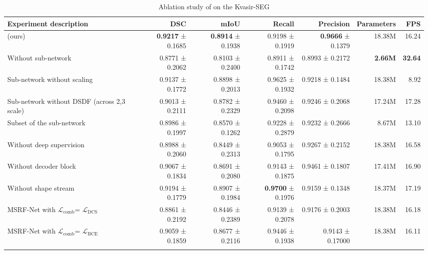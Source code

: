 \documentclass[journal,twoside,web]{IEEEtran}
\newcommand{\loss}{\ensuremath{\mathcal{L}}}
\newcommand{\lbce}{\ensuremath{\loss_\text{BCE}}\xspace}
\newcommand{\ldcs}{\ensuremath{\loss_\text{DCS}}\xspace}
\newcommand{\lcomb}{\ensuremath{\loss_\text{comb}}\xspace}
\newcommand{\sysname}{\text{MSRF-Net}\xspace}
\begin{document}
\begin{table*}
\centering
\caption{Ablation study of \sysname on the Kvasir-SEG}
\label{table:ablationstudy}
\scriptsize
\begin{center}
{
	\begin{tabular}{@{}l|r|r|r|r|r|r@{}} 
		\toprule
		 \textbf{Experiment description} & \textbf{DSC} & \textbf{mIoU} & \textbf{Recall} & \textbf{Precision} & \textbf{Parameters} & \textbf{FPS} \\ \hline
		 \hline
		 \sysname(ours) & \textbf{0.9217} ±  0.1685 & \textbf{0.8914} ± 0.1938 & 0.9198 ± 0.1919 & \textbf{0.9666} ± 0.1379 & 18.38M & 16.24\\ \hline
		 Without sub-network &0.8771 ± 0.2062 &0.8103 ± 0.2400 & 0.8911 ±  0.1742 & 0.8993 ± 0.2172 &  \textbf{2.66M} &  \textbf{32.64} \\ \hline
		 Sub-network without scaling &0.9137 ± 0.1772 &0.8898 ± 0.2013 &0.9625 ± 0.1932 &0.9218 ± 0.1484 & 18.38M & 8.92 \\ \hline
		 Sub-network without DSDF (across 2,3 scale) & 0.9013 ± 0.2111 & 0.8782 ± 0.2329 & 0.9460 ± 0.2098 & 0.9246 ± 0.2068 & 17.24M & 17.28  \\\hline
		 Subset of the sub-network & 0.8986 ± 0.1997 & 0.8570 ±  0.1262 & 0.9228 ± 0.2879 & 0.9232 ± 0.2666 & 8.67M & 13.10  \\ \hline
		 Without deep supervision & 0.8988 ± 0.2060 & 0.8449 ± 0.2313 & 0.9053 ± 0.1795 & 0.9267 ± 0.2152 & 18.38M & 16.58 \\ \hline
		 Without decoder block & 0.9067 ± 0.1834 & 0.8691 ± 0.2080 & 0.9143 ±  0.1875 & 0.9461 ± 0.1807 &17.41M & 16.90 \\ \hline
		 Without shape stream & 0.9194 ± 0.1779 & 0.8907 ± 0.1984 & \textbf{0.9700} ± 0.1976 & 0.9159 ± 0.1348 & 18.37M & 17.19\\
		 		 
		 \hline
		 MSRF-Net with \lcomb = \ldcs & 0.8861 ± 0.2192 & 0.8446 ± 0.2389 & 0.9139 ± 0.2078 & 0.9176 ± 0.2003 & 18.38M & 16.18\\ \hline
		 MSRF-Net with \lcomb = \lbce & 0.9059 ± 0.1859 & 0.8677 ± 0.2116 & 0.9446 ± 0.1938 & 0.9143 ± 0.17000 & 18.38M & 16.11\\ \hline
		 \bottomrule
\vspace{-10mm}		 
	\end{tabular}}
\end{center}
\end{table*}
\end{document}
